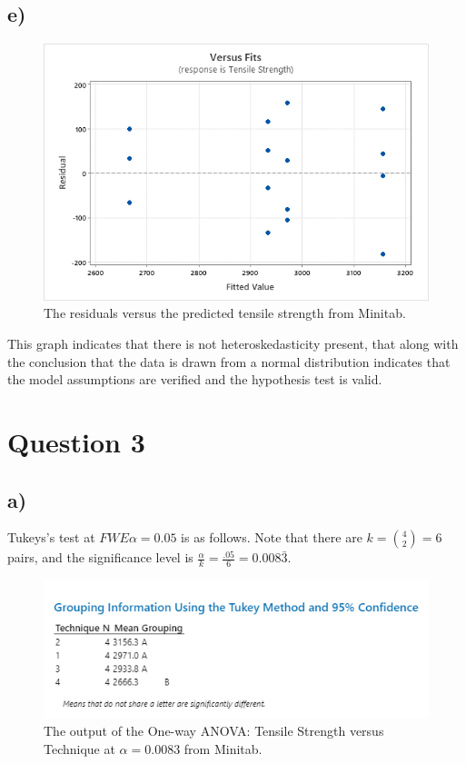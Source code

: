 \documentclass{article}
\begin{document}
\subsection*{e)}
\begin{figure}[h]
    \centering
    \includegraphics[width=1\textwidth]{./images/2_e.png}
    \caption{The residuals versus the predicted tensile strength from Minitab.}
    \label{fig:2_e}
\end{figure}
This graph indicates that there is not heteroskedasticity present,
that along with the conclusion that the data is drawn from
a normal distribution indicates that the model assumptions are verified
and the hypothesis test is valid.

\clearpage
\section*{Question 3}
\subsection*{a)}
Tukeys's test at $FWE\alpha = 0.05$ is as follows.
Note that there are $k = \binom{4}{2} = 6$ pairs, and the significance level is $\frac{\alpha}{k} = \frac{.05}{6} = 0.008\bar{3}$.
\begin{figure}[h]
  \centering
  \includegraphics[width=1\textwidth]{./images/3.png}
  \caption{The output of the One-way ANOVA: Tensile Strength versus Technique at $\alpha = 0.0083$ from Minitab.}
  \label{fig:2_a}
\end{figure}
\end{document}
